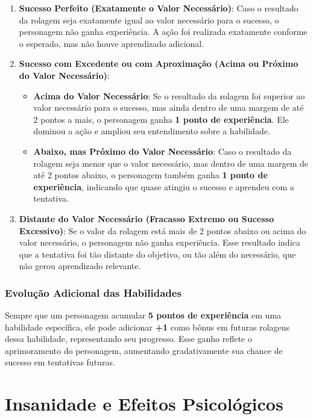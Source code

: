 \documentclass[a4paper,12pt]{book}
\begin{document}
\begin{enumerate}
    \item \textbf{Sucesso Perfeito (Exatamente o Valor Necessário)}: Caso o resultado da rolagem seja exatamente igual ao valor necessário para o sucesso, o personagem não ganha experiência. A ação foi realizada exatamente conforme o esperado, mas não houve aprendizado adicional.

    \item \textbf{Sucesso com Excedente ou com Aproximação (Acima ou Próximo do Valor Necessário)}:
    \begin{itemize}
        \item \textbf{Acima do Valor Necessário}: Se o resultado da rolagem foi superior ao valor necessário para o sucesso, mas ainda dentro de uma margem de até 2 pontos a mais, o personagem ganha \textbf{1 ponto de experiência}. Ele dominou a ação e ampliou seu entendimento sobre a habilidade.
        \item \textbf{Abaixo, mas Próximo do Valor Necessário}: Caso o resultado da rolagem seja menor que o valor necessário, mas dentro de uma margem de até 2 pontos abaixo, o personagem também ganha \textbf{1 ponto de experiência}, indicando que quase atingiu o sucesso e aprendeu com a tentativa.
    \end{itemize}
    
    \item \textbf{Distante do Valor Necessário (Fracasso Extremo ou Sucesso Excessivo)}: Se o valor da rolagem está mais de 2 pontos abaixo ou acima do valor necessário, o personagem não ganha experiência. Esse resultado indica que a tentativa foi tão distante do objetivo, ou tão além do necessário, que não gerou aprendizado relevante.
\end{enumerate}

\subsection{Evolução Adicional das Habilidades}

Sempre que um personagem acumular \textbf{5 pontos de experiência} em uma habilidade específica, ele pode adicionar \textbf{+1} como bônus em futuras rolagens dessa habilidade, representando seu progresso. Esse ganho reflete o aprimoramento do personagem, aumentando gradativamente sua chance de sucesso em tentativas futuras.




\chapter{Insanidade e Efeitos Psicológicos}
\end{document}

